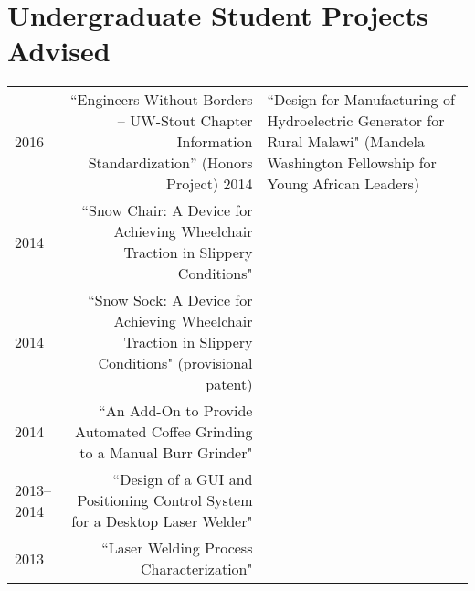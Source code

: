 
\section*{Undergraduate Student Projects Advised}
\begin{tabular}{L!{\VRule}R}
2016&``Engineers Without Borders – UW-Stout Chapter Information Standardization'' (Honors Project)
2014&``Design for Manufacturing of Hydroelectric Generator for Rural Malawi" (Mandela Washington Fellowship for Young African Leaders)\\
2014&``Snow Chair: A Device for Achieving Wheelchair Traction in Slippery Conditions"\\
2014&``Snow Sock: A Device for Achieving Wheelchair Traction in Slippery Conditions" (provisional patent)\\
2014&``An Add-On to Provide Automated Coffee Grinding to a Manual Burr Grinder"\\
2013--2014&``Design of a GUI and Positioning Control System for a Desktop Laser Welder"\\
2013&``Laser Welding Process Characterization"\\
\end{tabular}
